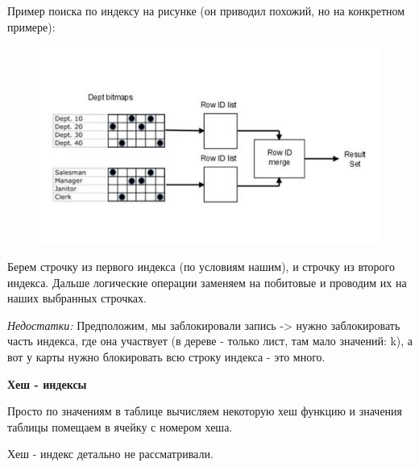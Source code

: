 Пример поиска по индексу на рисунке (он приводил похожий, но на конкретном примере): 
\begin{figure}[H]
	\centering
	\includegraphics[scale = 0.3]{4/Map.jpeg}
\end{figure}

Берем строчку из первого индекса (по условиям нашим), и строчку из второго индекса. Дальше логические операции заменяем на побитовые и проводим их на наших выбранных строчках. 

\textit{Недостатки:} Предположим, мы заблокировали запись -> нужно заблокировать часть индекса, где она участвует (в дереве - только лист, там мало значений: k), а вот у карты нужно блокировать всю строку индекса - это много.

\textbf{Хеш - индексы} 

Просто по значениям в таблице вычисляем некоторую хеш функцию и значения таблицы помещаем в ячейку с номером хеша. 

Хеш - индекс детально не рассматривали. 
